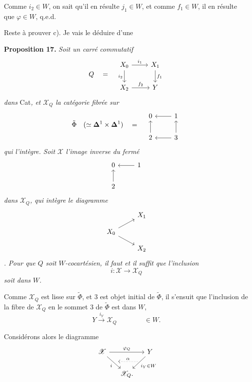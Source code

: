 \documentclass[11pt]{article}
\newcommand{\printedpage}[1]{\marginpar{\footnotesize p.~#1}}
\newcommand{\msp}[1]{\marginpar{\footnotesize [#1]}}
\newcommand{\cX}{\mathscr{X}}
\begin{document}
Comme $i_2 \in W$, on sait qu'il en résulte $j_1 \in W$, et comme $f_1 \in W$, il en résulte que $\varphi \in W$, q.e.d.

\printedpage{150}

Reste à prouver c). Je vais le déduire d'une

\textbf{Proposition 17.} \textit{Soit un carré commutatif}
\[
Q \quad = \quad
\begin{tikzcd}[ampersand replacement=\&]
X_0 \arrow[r, "i_1"] \arrow[d, "i_2"'] \& X_1 \arrow[d, "f_1"] \\
X_2 \arrow[r, "f_2"] \& Y
\end{tikzcd}
\]
\textit{dans} Cat\textit{, et $\cX_Q$ la catégorie fibrée sur}
\[
\tilde{\Phi} \quad (\simeq \mathbf{\Delta}^1 \times \mathbf{\Delta}^1) \quad = \quad
\begin{tikzcd}[ampersand replacement=\&]
0 \& 1 \arrow[l] \\
2 \arrow[u] \& 3 \arrow[l] \arrow[u]
\end{tikzcd}
\]
\textit{qui l'intègre. Soit $\cX$ l'image inverse du fermé}
\[
\begin{tikzcd}[ampersand replacement=\&]
0 \& 1 \arrow[l] \\
2 \arrow[u] \&
\end{tikzcd}
\]
\msp{page 235}
\textit{dans $\cX_Q$, qui intègre le diagramme}
\[
\begin{tikzcd}[ampersand replacement=\&, row sep=small]
 \& X_1 \\
X_0 \arrow[ru] \arrow[rd] \& \\
 \& X_2
\end{tikzcd}
\]
\textit{. Pour que $Q$ soit $W$-cocartésien, il faut et il suffit que l'inclusion}
\[
i : \cX \longrightarrow \cX_Q
\]
\textit{soit dans $W$.}

Comme $\cX_Q$ est lisse sur $\tilde{\Phi}$, et 3 est objet initial de $\tilde{\Phi}$, il s'ensuit que l'inclusion de la fibre de $\cX_Q$ en le sommet 3 de $\tilde{\Phi}$ est dans $W$,
\[
Y \xrightarrow{i_Y} \cX_Q \qquad\qquad \in W.
\]

Considérons alors le diagramme
\[
\begin{tikzcd}[ampersand replacement=\&, column sep=small]
\cX \arrow[rr, "\varphi_Q"] \arrow[rd, "i"', ""{name=direct,pos=.55,above right}] \& \& Y \arrow[ld, "i_Y\in W", ""{name=via,pos=.30,below left}] \\
 \& \cX_Q. \& \arrow[from=via,to=direct,dotted,shorten <=1pt,shorten >=1pt,"\alpha"']
\end{tikzcd}
\]
\end{document}
